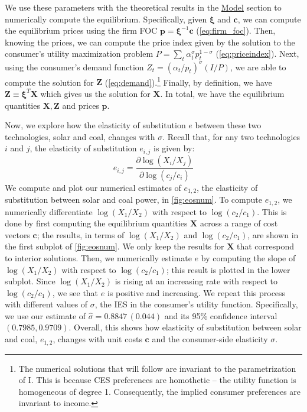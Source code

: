 \documentclass[11pt,a4paper,leqno]{extarticle}
\begin{document}
	We use these parameters with the theoretical results in the \hyperref[sec:Model]{Model} section to numerically compute the equilibrium. Specifically, given $\boldsymbol{\xi}$ and $\mathbf{c}$, we can compute the equilibrium prices using the firm FOC $\mathbf{p} = \boldsymbol{\xi}^{-1} \mathbf{c}$ (\autoref{eq:firm_foc}). Then, knowing the prices, we can compute the price index given by the solution to the consumer's utility maximization problem $P = \sum_t \alpha_t^\sigma p_t^{1-\sigma}$ (\autoref{eq:priceindex}). Next, using the consumer's demand function $Z_t = (\alpha_t / p_t)^{\sigma} (I/P)$, we are able to compute the solution for $\mathbf{Z}$ (\autoref{eq:demand}).\footnote{ 
	The numerical solutions that will follow are invariant to the parametrization of I. This is because CES preferences are homothetic -- the utility function is homogeneous of degree 1. Consequently, the implied consumer preferences are invariant to income. 
	} Finally, by definition, we have $\mathbf{Z} \equiv \boldsymbol{\xi}^T \mathbf{X}$ which gives us the solution for $\mathbf{X}$. In total, we have the equilibrium quantities $\mathbf{X}, \mathbf{Z}$ and prices $\mathbf{p}$.

	Now, we explore how the elasticity of substitution $e$ between these two technologies, solar and coal, changes with $\sigma$. Recall that, for any two technologies $i$ and $j$, the elasticity  of substitution $e_{i,j}$ is given by:
	$$e_{i,j} = \frac{\partial \log (X_i/ X_j)}{\partial \log (c_j/c_i)}$$
	We compute and plot our numerical estimates of $e_{1, 2}$, the elasticity of substitution between solar and coal power, in \autoref{fig:eosnum}. To compute $e_{1,2}$, we numerically differentiate $\log(X_1/X_2)$ with respect to $\log(c_2/c_1)$. This is done by first computing the equilibrium quantities $\mathbf{X}$ across a range of cost vectors $\mathbf{c}$; the results, in terms of $\log(X_1/X_2)$ and $\log(c_2/c_1)$, are shown in the first subplot of \autoref{fig:eosnum}. We only keep the results for $\mathbf{X}$ that correspond to interior solutions.  Then,  we numerically estimate $e$ by computing the slope of $\log(X_1/X_2)$ with respect to $\log(c_2/c_1)$; this result is plotted in the lower subplot. Since $\log(X_1/X_2)$ is rising at an increasing rate with respect to $\log(c_2/c_1)$, we see that $e$ is positive and increasing.  We repeat this process with different values of $\sigma$, the IES in the consumer's utility function. Specifically, we use our estimate of $\hat{\sigma} = 0.8847\, (0.044)$ and its 95\%  confidence interval $(0.7985, 0.9709)$. Overall, this shows how elasticity of substitution between solar and coal, $e_{1,2}$, changes with unit costs $\mathbf{c}$ and the consumer-side elasticity $\sigma$. 
		
\end{document}
